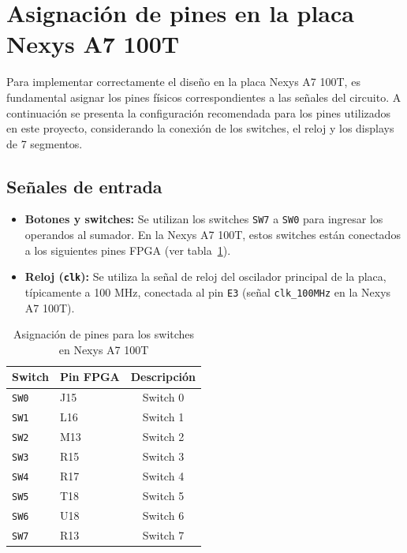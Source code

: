 \documentclass[a4paper,12pt]{article}
\begin{document}
\section{Asignación de pines en la placa Nexys A7 100T}

Para implementar correctamente el diseño en la placa Nexys A7 100T, es fundamental asignar los pines físicos correspondientes a las señales del circuito.  
A continuación se presenta la configuración recomendada para los pines utilizados en este proyecto, considerando la conexión de los switches, el reloj y los displays de 7 segmentos.

\subsection{Señales de entrada}

\begin{itemize}
  \item \textbf{Botones y switches:}  
  Se utilizan los switches \texttt{SW7} a \texttt{SW0} para ingresar los operandos al sumador.  
  En la Nexys A7 100T, estos switches están conectados a los siguientes pines FPGA (ver tabla~\ref{tab:switch_pins}).

  \item \textbf{Reloj (\texttt{clk}):}  
  Se utiliza la señal de reloj del oscilador principal de la placa, típicamente a 100 MHz, conectada al pin \texttt{E3} (señal \texttt{clk\_100MHz} en la Nexys A7 100T).
\end{itemize}

\begin{table}[H]
  \centering
  \begin{tabular}{llc}
    \toprule
    \textbf{Switch} & \textbf{Pin FPGA} & \textbf{Descripción} \\
    \midrule
    \texttt{SW0} & J15 & Switch 0 \\
    \texttt{SW1} & L16 & Switch 1 \\
    \texttt{SW2} & M13 & Switch 2 \\
    \texttt{SW3} & R15 & Switch 3 \\
    \texttt{SW4} & R17 & Switch 4 \\
    \texttt{SW5} & T18 & Switch 5 \\
    \texttt{SW6} & U18 & Switch 6 \\
    \texttt{SW7} & R13 & Switch 7 \\
    \bottomrule
  \end{tabular}
  \caption{Asignación de pines para los switches en Nexys A7 100T}
  \label{tab:switch_pins}
\end{table}
\end{document}

